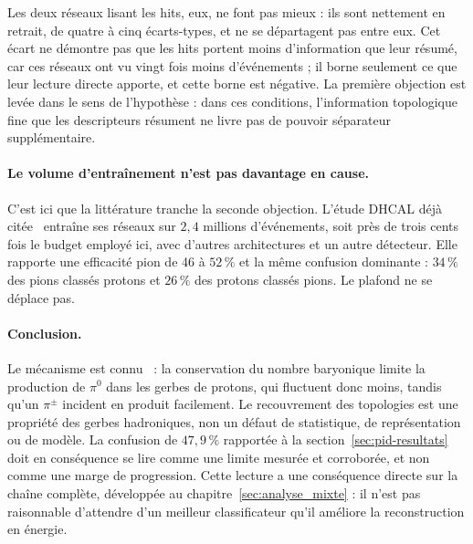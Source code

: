 Les deux réseaux lisant les hits, eux, ne font pas mieux : ils sont nettement en retrait, de quatre à cinq écarts-types, et ne se départagent pas entre eux. Cet écart ne démontre pas que les hits portent moins d'information que leur résumé, car ces réseaux ont vu vingt fois moins d'événements ; il borne seulement ce que leur lecture directe apporte, et cette borne est négative. La première objection est levée dans le sens de l'hypothèse : dans ces conditions, l'information topologique fine que les descripteurs résument ne livre pas de pouvoir séparateur supplémentaire.

\paragraph{Le volume d'entraînement n'est pas davantage en cause.} C'est ici que la littérature tranche la seconde objection. L'étude DHCAL déjà citée~\cite{borysova2025dhcalgnn} entraîne ses réseaux sur $2{,}4$ millions d'événements, soit près de trois cents fois le budget employé ici, avec d'autres architectures et un autre détecteur. Elle rapporte une efficacité pion de 46 à $52\,\%$ et la même confusion dominante : $34\,\%$ des pions classés protons et $26\,\%$ des protons classés pions. Le plafond ne se déplace pas.

\paragraph{Conclusion.} Le mécanisme est connu~\cite{akchurin1998proton} : la conservation du nombre baryonique limite la production de $\pi^0$ dans les gerbes de protons, qui fluctuent donc moins, tandis qu'un $\pi^\pm$ incident en produit facilement. Le recouvrement des topologies est une propriété des gerbes hadroniques, non un défaut de statistique, de représentation ou de modèle. La confusion de $47{,}9\,\%$ rapportée à la section~\ref{sec:pid-resultats} doit en conséquence se lire comme une limite mesurée et corroborée, et non comme une marge de progression. Cette lecture a une conséquence directe sur la chaîne complète, développée au chapitre~\ref{sec:analyse_mixte} : il n'est pas raisonnable d'attendre d'un meilleur classificateur qu'il améliore la reconstruction en énergie.
